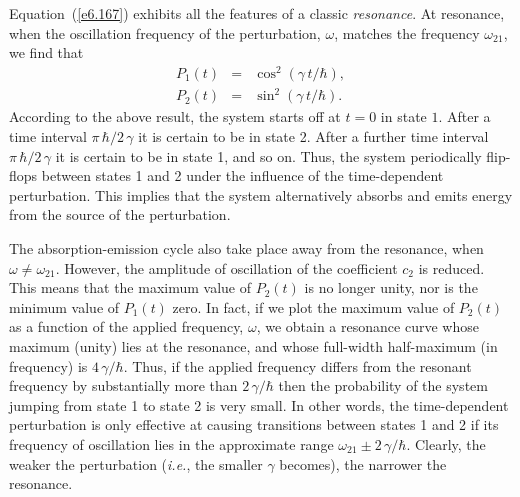 Equation~(\ref{e6.167}) exhibits all the features of a classic {\em resonance}.
At resonance, when the oscillation frequency of 
the perturbation, $\omega$, matches the frequency $\omega_{21}$, we find
that
\begin{eqnarray}
P_1(t) &=& \cos^2 (\gamma \,t / \hbar),\\[0.5ex]
P_2(t) &=& \sin^2 (\gamma \,t/\hbar ).
\end{eqnarray}
According to the above result,
 the system starts off at $t=0$ in state $1$. After a time
interval $\pi \,\hbar/2\,\gamma$ it is certain to be in state 2. After a
further time interval $\pi\, \hbar/2\,\gamma$ it is certain to be in
state 1, and so on. Thus, the system periodically flip-flops between states
1 and 2 under the influence of the time-dependent perturbation. This
implies that the system  alternatively absorbs and emits  energy from
the source of the perturbation. 

The absorption-emission cycle also take place away from the resonance,
when $\omega\neq \omega_{21}$. However, the amplitude of oscillation of
the coefficient $c_2$ is reduced. This means that the maximum value
of $P_2(t)$ is no longer unity, nor is the minimum value of $P_1(t)$
zero. In fact, if we plot the maximum value of $P_2(t)$ as a function
of the applied frequency, $\omega$, we obtain a resonance curve
whose maximum (unity) lies at the resonance, and whose full-width
half-maximum (in frequency) is $4\,\gamma/\hbar$. Thus, if the
applied frequency differs from the resonant frequency by  substantially
more than $2\,\gamma/\hbar$ then the probability of the system jumping from
state 1 to state 2 is very small. In other words, the time-dependent
perturbation is only effective at causing transitions between states
1 and 2 if its frequency of oscillation lies in the approximate range
$\omega_{21} \pm 2\,\gamma/\hbar$. Clearly, the weaker the perturbation
({\em i.e.}, the smaller $\gamma$ becomes), the narrower the resonance.


